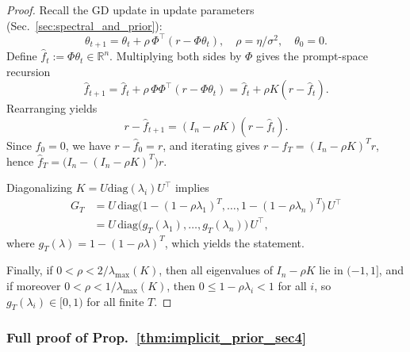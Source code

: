 \documentclass{article}
\theoremstyle{plain}
\theoremstyle{definition}
\theoremstyle{remark}
\begin{document}
\begin{proof}
Recall the GD update in update parameters (Sec.~\ref{sec:spectral_and_prior}):
\[
\theta_{t+1}=\theta_t+\rho\,\Phi^\top(r-\Phi\theta_t),
\quad \rho=\eta/\sigma^2,
\quad \theta_0=0.
\]
Define $\hat f_t:=\Phi\theta_t\in\mathbb{R}^n$. Multiplying both sides by $\Phi$ gives the prompt-space recursion
\[
    \hat f_{t+1} = \hat f_t+\rho\,\Phi\Phi^\top(r-\Phi\theta_t)
    = \hat f_t+\rho K(r-\hat f_t).
\]
Rearranging yields
\[
    r-\hat f_{t+1}=(I_n-\rho K)(r-\hat f_t).
\]
Since $\hat f_0=0$, we have $r-\hat f_0=r$, and iterating gives $r-\hat f_T=(I_n-\rho K)^T r$, hence $\hat f_T=\bigl(I_n-(I_n-\rho K)^T\bigr)r$.

Diagonalizing $K=U\mathrm{diag}(\lambda_i)U^\top$ implies
\begin{align*}
    G_T &= U\,\mathrm{diag}\!\bigl(1-(1-\rho\lambda_1)^T,\dots,1-(1-\rho\lambda_n)^T\bigr)\,U^\top \\
    &= U\,\mathrm{diag}\!\bigl(g_T(\lambda_1),\dots,g_T(\lambda_n)\bigr)\,U^\top,
\end{align*}
where $g_T(\lambda)=1-(1-\rho\lambda)^T$, which yields the statement.

Finally, if $0<\rho<2/\lambda_{\max}(K)$, then all eigenvalues of $I_n-\rho K$ lie in $(-1,1]$, and if moreover $0<\rho<1/\lambda_{\max}(K)$, then $0\le 1-\rho\lambda_i<1$ for all $i$, so $g_T(\lambda_i)\in[0,1)$ for all finite $T$.
\end{proof}

\subsubsection{Full proof of Prop.~\ref{thm:implicit_prior_sec4}}
\label{app:proof_implicit_prior}
\end{document}
